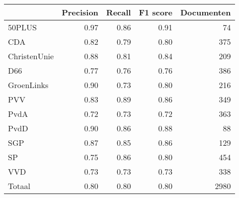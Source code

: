 \begin{tabular}{lrrrr}
\toprule
{} &  Precision &  Recall &  F1 score &  Documenten \\
\midrule
50PLUS       &       0.97 &    0.86 &      0.91 &          74 \\
CDA          &       0.82 &    0.79 &      0.80 &         375 \\
ChristenUnie &       0.88 &    0.81 &      0.84 &         209 \\
D66          &       0.77 &    0.76 &      0.76 &         386 \\
GroenLinks   &       0.90 &    0.73 &      0.80 &         216 \\
PVV          &       0.83 &    0.89 &      0.86 &         349 \\
PvdA         &       0.72 &    0.73 &      0.72 &         363 \\
PvdD         &       0.90 &    0.86 &      0.88 &          88 \\
SGP          &       0.87 &    0.85 &      0.86 &         129 \\
SP           &       0.75 &    0.86 &      0.80 &         454 \\
VVD          &       0.73 &    0.73 &      0.73 &         338 \\
Totaal       &       0.80 &    0.80 &      0.80 &        2980 \\
\bottomrule
\end{tabular}
